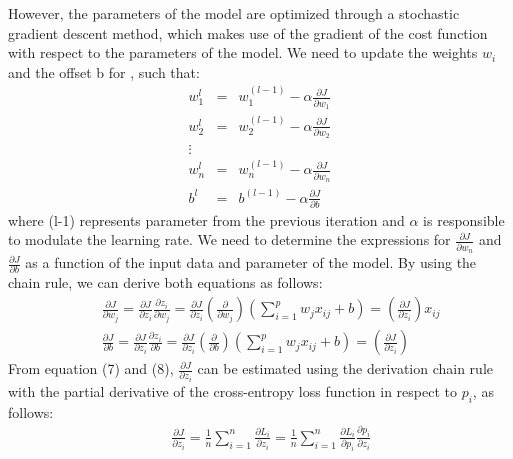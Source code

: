\documentclass{article}
\begin{document}
However, the parameters of the model are optimized through a stochastic gradient descent method, which makes use of the gradient of the cost function with respect to the parameters of the model. We need to update the weights $w_i$ and the offset b for , such that:
\begin{eqnarray}
w_1^{l}&=&w_{1}^{(l-1)} - \alpha \frac{\partial{J}}{\partial{w_1}} \nonumber \\
w_2^{l}&=&w_{2}^{(l-1)} - \alpha \frac{\partial{J}}{\partial{w_2}} \nonumber \\
\vdots \nonumber \\
w_n^{l}&=&w_{n}^{(l-1)} - \alpha \frac{\partial{J}}{\partial{w_n}} \\
b^{l}&=&b^{(l-1)} - \alpha \frac{\partial{J}}{\partial{b}}
\end{eqnarray}
where (l-1) represents parameter from the previous iteration and $\alpha$ is responsible to modulate the learning rate. We need to determine the expressions for $\frac{\partial{J}}{\partial{w_n}}$ and $\frac{\partial{J}}{\partial{b}}$ as a function of the input data and parameter of the model. By using the chain rule, we can derive both equations as follows:
\begin{eqnarray}
&&\frac{\partial{J}}{\partial{w_j}} = \frac{\partial{J}}{\partial{z_i}} \frac{\partial{z_i}}{\partial{w_j}}   =  \frac{\partial{J}}{\partial{z_i}} \left( \frac{\partial}{\partial{w_j}}\right)\left(\sum_{i=1}^{p}w_j x_{ij} + b\right) = \left(\frac{\partial{J}}{\partial{z_i}}\right) x_{ij}
\\
&&\frac{\partial{J}}{\partial{b}} = \frac{\partial{J}}{\partial{z_i}} \frac{\partial{z_i}}{\partial{b}}   =  \frac{\partial{J}}{\partial{z_i}} \left( \frac{\partial}{\partial{b}}\right)\left(\sum_{i=1}^{p}w_j x_{ij} + b\right) = \left(\frac{\partial{J}}{\partial{z_i}}\right)
\end{eqnarray}
From equation (7) and (8), $\frac{\partial{J}}{\partial{z_i}} $ can be estimated using the derivation chain rule with the partial derivative of the cross-entropy loss function in respect to $p_i$, as follows:
\begin{eqnarray}
&&\frac{\partial{J}}{\partial{z_i}} =  \frac{1}{n}\sum_{i=1}^{n} \frac{\partial{L_i}}{\partial{z_i}}  = \frac{1}{n}\sum_{i=1}^{n} \frac{\partial{L_i}}{\partial{p_i}}\frac{\partial{p_i}}{\partial{z_i}} 
\end{eqnarray}
\end{document}
